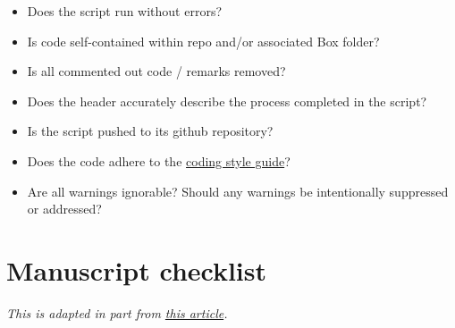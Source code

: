 \documentclass[
]{book}
\providecommand{\tightlist}{%
  \setlength{\itemsep}{0pt}\setlength{\parskip}{0pt}}
\begin{document}
\begin{itemize}
\tightlist
\item
  Does the script run without errors?
\item
  Is code self-contained within repo and/or associated Box folder?
\item
  Is all commented out code / remarks removed?
\item
  Does the header accurately describe the process completed in the script?
\item
  Is the script pushed to its github repository?
\item
  Does the code adhere to the \href{https://jadebc.github.io/lab-manual/coding-style.html}{coding style guide}?
\item
  Are all warnings ignorable? Should any warnings be intentionally suppressed or addressed?
\end{itemize}

\section{Manuscript checklist}\label{manuscript-checklist}

\emph{This is adapted in part from \href{https://www.nature.com/articles/d41586-019-01431-z}{this article}.}
\end{document}

